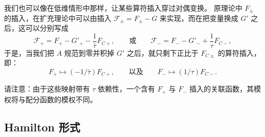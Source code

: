 
我们也可以像在低维情形中那样，让某些算符插入穿过对偶变换。
原理论中 $F_{\pm}$ 的插入，在扩充理论中可以由插入 $\mathcal{F}_{\pm}=F_{\pm}-G$ 来实现，而在把变量换成 $G'$ 之后，这可以分别写成
\begin{equation}
  \tag{8.73}
  \label{eq:8-73}
  \mathcal{F}_{+}=F_{+}-G'_{+}-\frac{1}{\bar\tau}F_{C+},\qquad\text{或}\qquad \mathcal{F}_{-}=F_{-}-G'_{-}+\frac{1}{\tau}F_{C-},
\end{equation}
于是，当我们把 $A$ 规范到零并积掉 $G'$ 之后，就只剩下正比于 $F_{C\pm}$ 的算符插入，即：
\begin{equation}
  \tag{8.74}
  \label{eq:8-74}
  F_{+}\mapsto\left(-1/\bar\tau\right)F_{C+},\qquad\text{以及}\qquad F_{-}\mapsto\left(1/\tau\right)F_{C-}.
\end{equation}

请注意：由于这些映射带有 $\tau$ 依赖性，一个含有 $F_{+}$ 与 $F_{-}$ 插入的关联函数，其模权将与配分函数的模权不同。

\subsection{Hamilton 形式}

